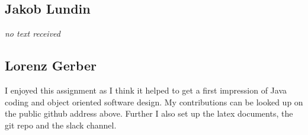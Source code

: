 \documentclass[a4paper,11pt,twoside]{article}
\begin{document}
\subsection{Jakob Lundin}
\textit{no text received}

\subsection{Lorenz Gerber}
I enjoyed this assignment as I think it helped to get a first
impression of Java coding and object oriented software design. 
My contributions can be looked up on the public github address
above. Further I also set up the latex documents, the git repo and the
slack channel.   


\end{document}
